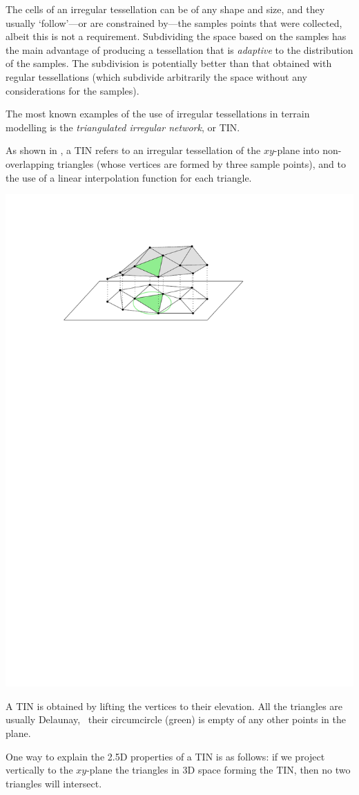 The cells of an irregular tessellation can be of any shape and size, and they usually `follow'---or are constrained by---the samples points that were collected, albeit this is not a requirement. 
Subdividing the space based on the samples has the main advantage of producing a tessellation that is \emph{adaptive} to the distribution of the samples. 
The subdivision is potentially better than that obtained with regular tessellations (which subdivide arbitrarily the space without any considerations for the samples).

%

The most known examples of the use of irregular tessellations in terrain modelling is the \emph{triangulated irregular network}, or TIN\@.%

As shown in , a TIN refers to an irregular tessellation of the $xy$-plane into non-overlapping triangles (whose vertices are formed by three sample points), and to the use of a linear interpolation function for each triangle. 
\begin{marginfigure}
  \includegraphics{figs/tin}
  \caption{A TIN is obtained by lifting the vertices to their elevation. All the triangles are usually Delaunay, \ie\ their circumcircle (green) is empty of any other points in the plane.}%
\end{marginfigure}
One way to explain the 2.5D properties of a TIN is as follows: if we project vertically to the $xy$-plane the triangles in 3D space forming the TIN, then no two triangles will intersect.

